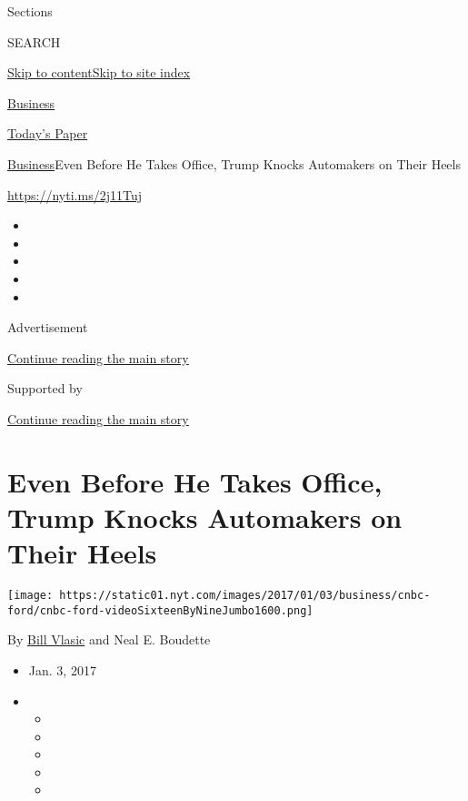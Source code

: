 Sections

SEARCH

\protect\hyperlink{site-content}{Skip to
content}\protect\hyperlink{site-index}{Skip to site index}

\href{https://www.nytimes.com/section/business}{Business}

\href{https://myaccount.nytimes.com/auth/login?response_type=cookie\&client_id=vi}{}

\href{https://www.nytimes.com/section/todayspaper}{Today's Paper}

\href{/section/business}{Business}\textbar{}Even Before He Takes Office,
Trump Knocks Automakers on Their Heels

\url{https://nyti.ms/2j11Tuj}

\begin{itemize}
\item
\item
\item
\item
\item
\end{itemize}

Advertisement

\protect\hyperlink{after-top}{Continue reading the main story}

Supported by

\protect\hyperlink{after-sponsor}{Continue reading the main story}

\hypertarget{even-before-he-takes-office-trump-knocks-automakers-on-their-heels}{%
\section{Even Before He Takes Office, Trump Knocks Automakers on Their
Heels}\label{even-before-he-takes-office-trump-knocks-automakers-on-their-heels}}

\texttt{[image: https://static01.nyt.com/images/2017/01/03/business/cnbc-ford/cnbc-ford-videoSixteenByNineJumbo1600.png]}

By \href{http://www.nytimes.com/by/bill-vlasic}{Bill Vlasic} and Neal E.
Boudette

\begin{itemize}
\item
  Jan. 3, 2017
\item
  \begin{itemize}
  \item
  \item
  \item
  \item
  \item
  \end{itemize}
\end{itemize}

